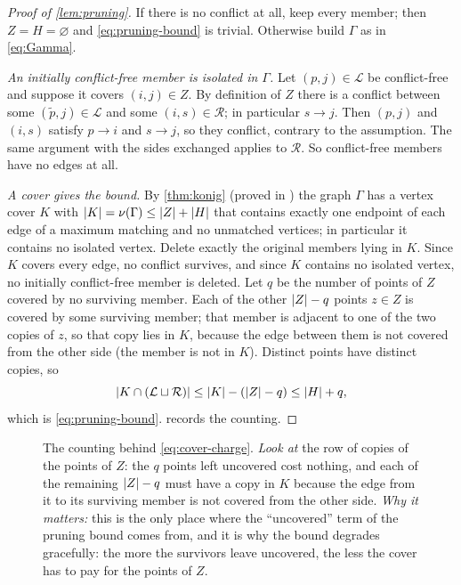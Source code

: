 \begin{proof}[Proof of \cref{lem:pruning}]
If there is no conflict at all, keep every member; then $Z=H=\varnothing$ and
\eqref{eq:pruning-bound} is trivial. Otherwise build $\Gamma$ as in \eqref{eq:Gamma}.

\emph{An initially conflict-free member is isolated in $\Gamma$.} Let $(p,j)\in\mathcal L$ be
conflict-free and suppose it covers $(i,j)\in Z$. By definition of $Z$ there is a conflict between
some $(\tilde p,j)\in\mathcal L$ and some $(i,s)\in\mathcal R$; in particular $s\to j$. Then
$(p,j)$ and $(i,s)$ satisfy $p\to i$ and $s\to j$, so they conflict, contrary to the assumption.
The same argument with the sides exchanged applies to $\mathcal R$. So conflict-free members have
no edges at all.

\emph{A cover gives the bound.} By \cref{thm:konig} (proved in ) the graph
$\Gamma$ has a vertex cover $K$ with $\lvert K\rvert=\nu(\Gamma)\le\lvert Z\rvert+\lvert H\rvert$ that contains exactly one
endpoint of each edge of a maximum matching and no unmatched vertices; in particular it contains no
isolated vertex. Delete exactly the original members lying in $K$. Since $K$ covers every edge, no
conflict survives, and since $K$ contains no isolated vertex, no initially conflict-free member is
deleted. Let $q$ be the number of points of $Z$ covered by no surviving member. Each of the other
$\lvert Z\rvert-q$ points $z\in Z$ is covered by some surviving member; that member is adjacent to one of
the two copies of $z$, so that copy lies in $K$, because the edge between them is not covered from
the other side (the member is not in $K$). Distinct points have distinct copies, so
\begin{equation}\label{eq:cover-charge}
 \lvert K\cap(\mathcal L\sqcup\mathcal R)\rvert
 \le\lvert K\rvert-(\lvert Z\rvert-q)\le\lvert H\rvert+q ,
\end{equation}
which is \eqref{eq:pruning-bound}.  records the counting.
\end{proof}

\begin{figure}[t]
\centering

\caption{The counting behind \eqref{eq:cover-charge}. \emph{Look at} the row of copies of the points
 of $Z$: the $q$ points left uncovered cost nothing, and each of the remaining $\lvert Z\rvert-q$ must have a
 copy in $K$ because the edge from it to its surviving member is not covered from the other side.
 \emph{Why it matters:} this is the only place where the ``uncovered'' term of the pruning bound comes
 from, and it is why the bound degrades gracefully: the more the survivors leave uncovered, the less
 the cover has to pay for the points of $Z$.}
\label{fig:cover}
\end{figure}

